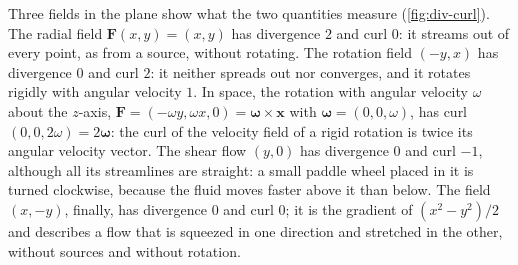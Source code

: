 Three fields in the plane show what the two quantities measure (\cref{fig:div-curl}). The radial field $\mathbf F(x,y)=(x,y)$ has divergence $2$ and curl $0$: it streams out of every point, as from a source, without rotating. The rotation field $(-y,x)$ has divergence $0$ and curl $2$: it neither spreads out nor converges, and it rotates rigidly with angular velocity $1$. In space, the rotation with angular velocity $\omega$ about the $z$-axis, $\mathbf F=(-\omega y,\omega x,0)=\boldsymbol\omega\times\mathbf x$ with $\boldsymbol\omega=(0,0,\omega)$, has curl $(0,0,2\omega)=2\boldsymbol\omega$: the curl of the velocity field of a rigid rotation is twice its angular velocity vector. The shear flow $(y,0)$ has divergence $0$ and curl $-1$, although all its streamlines are straight: a small paddle wheel placed in it is turned clockwise, because the fluid moves faster above it than below. The field $(x,-y)$, finally, has divergence $0$ and curl $0$; it is the gradient of $(x^2-y^2)/2$ and describes a flow that is squeezed in one direction and stretched in the other, without sources and without rotation.

